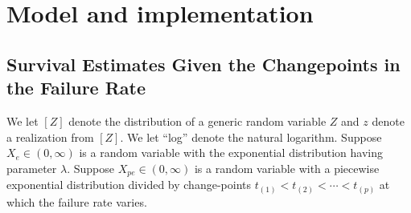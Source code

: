 \documentclass[12pt] {article}
\begin{document}
\section{Model and implementation}
\label{sec2}

\subsection{Survival Estimates Given the Changepoints in the Failure Rate}
We let $[Z]$
denote the distribution of a generic random variable
$Z$ and $z$ denote a realization from $[Z].$
We let ``log'' denote the natural logarithm.
Suppose $X_e\in (0,\infty)$ is a random variable with the
exponential distribution having parameter $\lambda$.
Suppose $X_{pe}\in (0,\infty)$ is a random variable with
a piecewise exponential distribution divided by
change-points $t_{(1)}<t_{(2)}< \cdots <t_{(p)}$
at which the failure rate varies.
\end{document}
